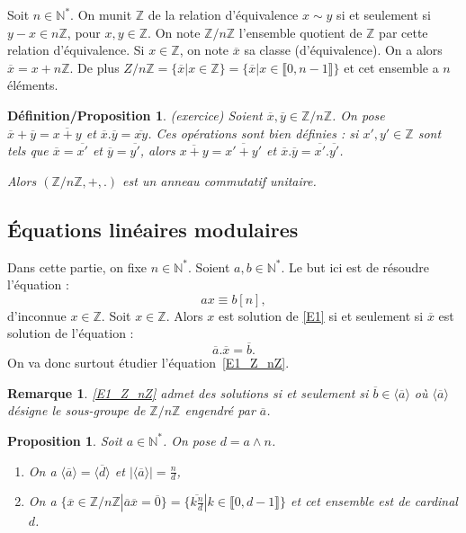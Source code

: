 \documentclass[12pt]{report}
\newtheorem*{rem}{Remarque}
\newtheorem{Def/prop}[thm]{Définition/Proposition}
\newtheorem{proposition}[thm]{Proposition}
\newcommand{\N}{\mathbb{N}}
\newcommand{\Z}{\mathbb{Z}}
\begin{document}
Soit $n \in \mathbb{N}^*$. On munit $\Z$ de la relation d'équivalence $x\sim y$ si et seulement si $y-x\in n\Z$, pour $x,y\in \Z$.  On note $\mathbb{Z}/n \mathbb{Z}$ l'ensemble quotient de $\Z$ par cette relation d'équivalence. Si $x\in \Z$, on note $\overline{x}$ sa classe (d'équivalence). On a alors $\overline{x}=x+n\Z$. De plus $Z/n\Z=\{\overline{x}|x\in \Z\}=\{\overline{x}| x\in \llbracket 0,n-1\rrbracket\}$ et cet ensemble a $n$ éléments.


\begin{Def/prop}(exercice)
Soient  $\overline{x},\overline{y}\in \Z/n\Z$. On pose $\overline{x}+\overline{y}=\overline{x+y}$ et $\overline{x}.\overline{y}=\overline{xy}$. Ces opérations sont bien définies : si $x',y'\in \Z$ sont tels que $\overline{x}=\overline{x'}$ et $\overline{y}=\overline{y'}$, alors $\overline{x+y}=\overline{x'+y'}$ et $\overline{x}.\overline{y}=\overline{x'}.\overline{y'}$. 

Alors $(\Z/n\Z,+,.)$ est un anneau commutatif unitaire.
\end{Def/prop}



\subsection{Équations linéaires modulaires}

Dans cette partie, on fixe $n\in \N^*$. Soient $a,b \in \mathbb{N}^*$. Le but ici est de résoudre l'équation :
\begin{equation}\label{E1}
ax \equiv b [n],
\end{equation} d'inconnue $x\in \Z$. Soit $x\in \Z$. Alors $x$ est solution de \eqref{E1} si et seulement si $\overline{x}$ est solution de l'équation : \begin{equation}\label{E1_Z_nZ}
\overline{a}.\overline{x}=\overline{b}.
\end{equation} On va donc surtout étudier l'équation~\eqref{E1_Z_nZ}.



\begin{rem}
\eqref{E1_Z_nZ} admet des solutions si et seulement si $\overline{b}  \in \langle \overline{a} \rangle$ où $\langle \overline{a} \rangle $ désigne le sous-groupe de $\mathbb{Z}/n\mathbb{Z}$ engendré par $\overline{a}$.
\end{rem}


\begin{proposition}\label{propMultiplication_par_abar}
Soit $a \in \mathbb{N}^*$. On pose $d=a \wedge n$. \begin{enumerate}
\item  On a $\langle \overline{a} \rangle= \langle \overline{d} \rangle$  et $| \langle \overline{a} \rangle | = \tfrac{n}{d}$,

\item On a $\{\overline{x}\in \Z/n\Z|\overline{a}\overline{x}=\overline{0}\}=\{\overline{k\frac{n}{d}}|k\in \llbracket 0,d-1\rrbracket\}$ et cet ensemble est de cardinal $d$.
\end{enumerate}
\end{proposition}
\end{document}
